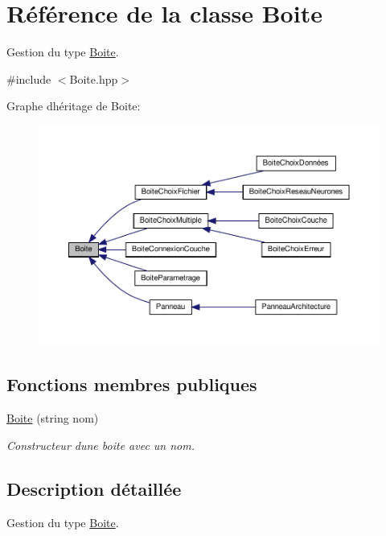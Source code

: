 \hypertarget{classBoite}{}\section{Référence de la classe Boite}
\label{classBoite}


Gestion du type \hyperlink{classBoite}{Boite}.  




{\ttfamily \#include $<$Boite.\+hpp$>$}



Graphe d\textquotesingle{}héritage de Boite\+:
\nopagebreak
\begin{figure}[H]
\begin{center}
\leavevmode
\includegraphics[width=350pt]{classBoite__inherit__graph}
\end{center}
\end{figure}
\subsection*{Fonctions membres publiques}
\begin{DoxyCompactItemize}
\item 
\mbox{\label{classBoite_abb48ea45974db03f2c1793a7db214d82}} 
\hyperlink{classBoite_abb48ea45974db03f2c1793a7db214d82}{Boite} (string nom)
\begin{DoxyCompactList}\small\item\em Constructeur d\textquotesingle{}une boite avec un nom. \end{DoxyCompactList}\end{DoxyCompactItemize}


\subsection{Description détaillée}
Gestion du type \hyperlink{classBoite}{Boite}. 

